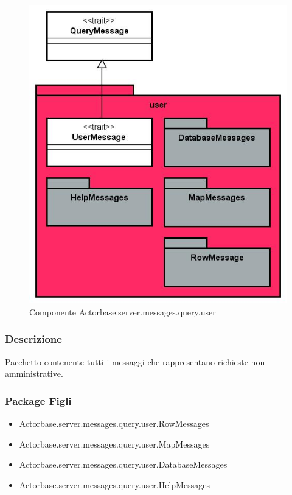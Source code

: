 \documentclass[a4paper]{article}
\begin{document}
			\begin{figure}[H]
				\centering
				\includegraphics[width=\textwidth]{ST/Server/userLevel.jpg}
				\caption{Componente Actorbase.server.messages.query.user}
			\end{figure}
			
			\subsubsection{Descrizione}
				Pacchetto contenente tutti i messaggi che rappresentano richieste non amministrative.
				
			\subsubsection{Package Figli}
				\begin{itemize}
					\item Actorbase.server.messages.query.user.RowMessages
					\item Actorbase.server.messages.query.user.MapMessages
					\item Actorbase.server.messages.query.user.DatabaseMessages
					\item Actorbase.server.messages.query.user.HelpMessages
				\end{itemize}
				
\end{document}
